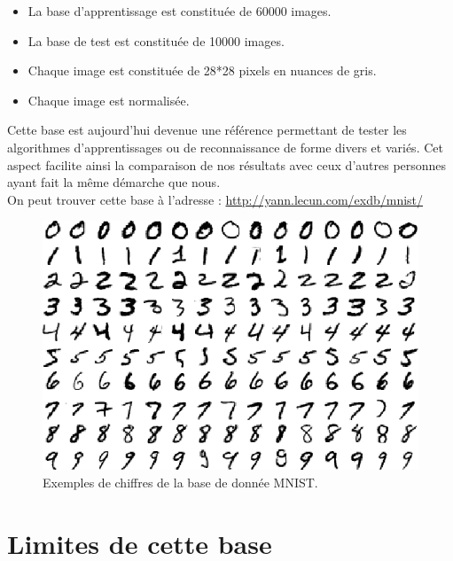 \documentclass[a4paper,oneside]{report}
\begin{document}
                \begin{itemize}
                    \item La base d'apprentissage est constituée de 60000 images.
                    \item La base de test est constituée de 10000 images.
                    \item Chaque image est constituée de 28*28 pixels en nuances de gris.
                    \item Chaque image est normalisée.\\
                \end{itemize}

                Cette base est aujourd'hui devenue une référence permettant de tester les algorithmes 
d'apprentissages ou de reconnaissance de forme divers et variés. Cet aspect facilite 
ainsi la comparaison de nos 
résultats avec ceux d'autres personnes ayant fait la même démarche que nous.\\   
On peut trouver cette base à l'adresse : \url{http://yann.lecun.com/exdb/mnist/}

                \begin{figure}
                    \begin{center}
                        \includegraphics{Images/mnist-01.png}
                    \end{center}
                    \caption{Exemples de chiffres de la base de donnée MNIST.}
                \end{figure}


            \section{Limites de cette base}
\end{document}
